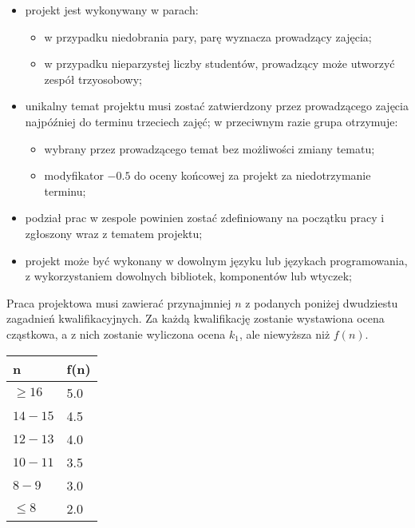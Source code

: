 \documentclass{article}
\renewcommand{\arraystretch}{1.4}
\begin{document}
	\begin{itemize}
		\item projekt jest wykonywany w parach:
		\begin{itemize}
			\item w przypadku niedobrania pary, parę wyznacza prowadzący zajęcia;
			\item w przypadku nieparzystej liczby studentów, prowadzący może utworzyć zespół trzyosobowy;
		\end{itemize}
		\item unikalny temat projektu musi zostać zatwierdzony przez prowadzącego zajęcia najpóźniej do terminu trzeciech zajęć; w przeciwnym razie grupa otrzymuje:
		\begin{itemize}
			\item wybrany przez prowadzącego temat bez możliwości zmiany tematu;
			\item modyfikator $-0.5$ do oceny końcowej za projekt za niedotrzymanie terminu;
		\end{itemize}
		\item podział prac w zespole powinien zostać zdefiniowany na początku pracy i zgłoszony wraz z tematem projektu;
		\item projekt może być wykonany w dowolnym języku lub językach programowania, z wykorzystaniem dowolnych bibliotek, komponentów lub wtyczek;
	\end{itemize}
	
	\newpage
	
	Praca projektowa musi zawierać przynajmniej $n$ z podanych poniżej dwudziestu zagadnień kwalifikacyjnych. Za każdą kwalifikację zostanie wystawiona ocena cząstkowa, a z nich zostanie wyliczona ocena $k_1$, ale niewyższa niż $f(n)$.
	
	\begin{center}
		\begin{tabularx}{.5\textwidth}{X|X}
		\textbf{n} & \textbf{ f(n) } \\ \hline
		$ \geq 16 $ &  5.0 \\ \hline
		$ 14-15 $ &  4.5 \\ \hline
		$ 12-13 $ &  4.0 \\ \hline
		$ 10-11 $ &  3.5 \\ \hline
		$ 8-9 $ &  3.0 \\ \hline
		$ \le 8 $ &  2.0 \\
		\end{tabularx}
	\end{center}
	
	\renewcommand{\arraystretch}{1.9}
	
\end{document}
